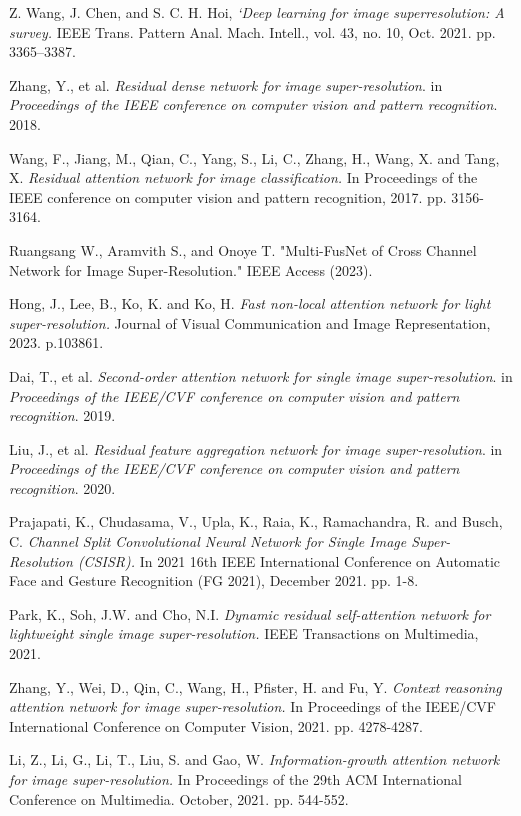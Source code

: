 \documentclass[twocolumn]{svjour3}          %
\begin{document}
\begin{thebibliography}{00}
 Z. Wang, J. Chen, and S. C. H. Hoi, \textit{‘Deep learning for image superresolution: A survey.}  IEEE Trans. Pattern Anal. Mach. Intell., vol. 43, no. 10, Oct. 2021. pp. 3365–3387.

 Zhang, Y., et al. \textit{Residual dense network for image super-resolution}. in \textit{Proceedings of the IEEE conference on computer vision and pattern recognition}. 2018.

 Wang, F., Jiang, M., Qian, C., Yang, S., Li, C., Zhang, H., Wang, X. and Tang, X. \textit{Residual attention network for image classification.} In Proceedings of the IEEE conference on computer vision and pattern recognition, 2017. pp. 3156-3164.

 Ruangsang W., Aramvith S., and Onoye T. "Multi-FusNet of Cross Channel Network for Image Super-Resolution." IEEE Access (2023).

 Hong, J., Lee, B., Ko, K. and Ko, H. \textit{Fast non-local attention network for light super-resolution.} Journal of Visual Communication and Image Representation, 2023. p.103861.

 Dai, T., et al. \textit{Second-order attention network for single image super-resolution}. in \textit{Proceedings of the IEEE/CVF conference on computer vision and pattern recognition}. 2019.

 Liu, J., et al. \textit{Residual feature aggregation network for image super-resolution}. in \textit{Proceedings of the IEEE/CVF conference on computer vision and pattern recognition}. 2020.

 Prajapati, K., Chudasama, V., Upla, K., Raia, K., Ramachandra, R. and Busch, C. \textit{Channel Split Convolutional Neural Network for Single Image Super-Resolution (CSISR).} In 2021 16th IEEE International Conference on Automatic Face and Gesture Recognition (FG 2021), December 2021. pp. 1-8. 

 Park, K., Soh, J.W. and Cho, N.I. \textit{Dynamic residual self-attention network for lightweight single image super-resolution.} IEEE Transactions on Multimedia, 2021.

 Zhang, Y., Wei, D., Qin, C., Wang, H., Pfister, H. and Fu, Y. \textit{Context reasoning attention network for image super-resolution.} In Proceedings of the IEEE/CVF International Conference on Computer Vision, 2021. pp. 4278-4287.

 Li, Z., Li, G., Li, T., Liu, S. and Gao, W. \textit{Information-growth attention network for image super-resolution.} In Proceedings of the 29th ACM International Conference on Multimedia. October, 2021. pp. 544-552.


\end{thebibliography}
\end{document}
